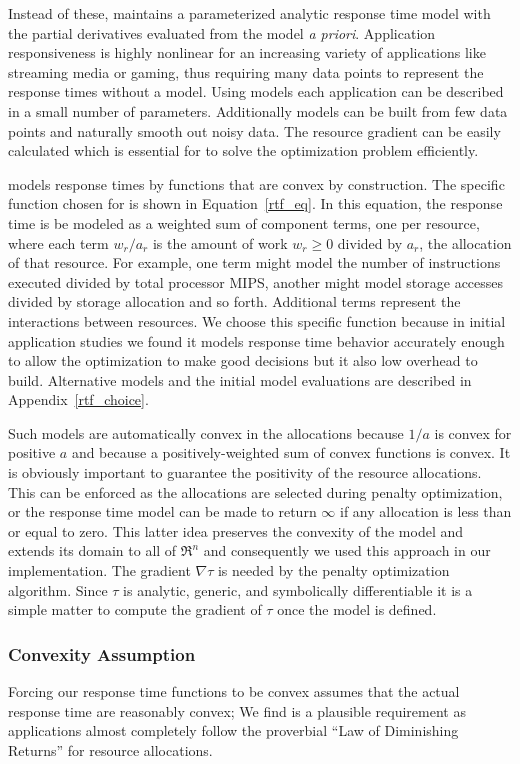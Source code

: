 Instead of these, \pacora maintains a parameterized analytic response time model with the partial derivatives evaluated from the model \emph{a priori}. Application responsiveness is highly nonlinear for an increasing variety of applications like streaming media or gaming, thus requiring many data points to represent the response times without a model. Using models each application can be described in a small number of parameters.  Additionally models can be built from few data points and naturally smooth out noisy data. The resource gradient can be easily calculated which is essential for \pacora to solve the optimization problem efficiently.  

\pacora models response times by functions that are convex by construction.  The specific function chosen for \pacora is shown in Equation~\ref{rtf_eq}.  In this equation, the response time is be modeled as a weighted sum of component terms, one per resource, where each term $w_r/a_r$ is the amount of work $w_r \geq 0$ divided by $a_r$, the allocation of that resource\cite{Snav}. For example, one term might model the number of instructions executed divided by total processor MIPS, another might model storage accesses divided by storage allocation and so forth. Additional terms represent the interactions between resources. We choose this specific function because in initial application studies we found it models response time behavior accurately enough to allow the optimization to make good decisions but it also low overhead to build.  Alternative models and the initial model evaluations are described in Appendix~\ref{rtf_choice}.

Such models are automatically convex in the allocations because $1/a$ is convex for positive $a$ and because a positively-weighted sum of convex functions is convex.  It is obviously important to guarantee the positivity of the resource allocations. This can be enforced as the allocations are selected during penalty optimization, or the response time model can be made to return $\infty$ if any allocation is less than or equal to zero. This latter idea preserves the convexity of the model and extends its domain to all of $\Re^n$ and consequently we used this approach in our implementation. The gradient $\nabla\tau$ is needed by the penalty optimization algorithm.
Since $\tau$ is analytic, generic, and symbolically differentiable
it is a simple matter to compute the gradient of $\tau$ once the model is defined.

\subsubsection*{Convexity Assumption}
Forcing our response time functions to be convex assumes that the actual response time are reasonably convex; We find is a plausible requirement as applications almost completely follow the proverbial ``Law of Diminishing Returns'' for resource allocations.   

